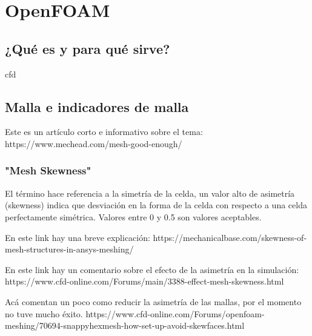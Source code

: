 \section{OpenFOAM}
\subsection{¿Qué es y para qué sirve?}
cfd
\subsection{Malla e indicadores de malla}

Este es un artículo corto e informativo sobre el tema:
https://www.mechead.com/mesh-good-enough/

\subsubsection{"Mesh Skewness"}
El término hace referencia a la simetría de la celda, un valor alto de
asimetría (skewness) indica que desviación en la forma de la celda con respecto
a una celda perfectamente simétrica. Valores entre 0 y 0.5 son valores
aceptables.

En este link hay una breve explicación:
https://mechanicalbase.com/skewness-of-mesh-structures-in-ansys-meshing/

En este link hay un comentario sobre el efecto de la asimetría en la simulación:
https://www.cfd-online.com/Forums/main/3388-effect-mesh-skewness.html

Acá comentan un poco como reducir la asimetría de las mallas, por el momento no
tuve mucho éxito.
https://www.cfd-online.com/Forums/openfoam-meshing/70694-snappyhexmesh-how-set-up-avoid-skewfaces.html
